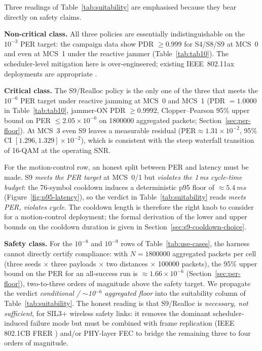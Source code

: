 \documentclass[journal,onecolumn,11pt,a4paper]{IEEEtran}
\begin{document}
Three readings of Table~\ref{tab:suitability} are emphasised because
they bear directly on safety claims.

\textbf{Non-critical class.} All three policies are essentially
indistinguishable on the $10^{-3}$ PER target: the campaign data
show PDR $\geq 0.999$ for S4/S8/S9 at MCS~0 and even at MCS~1 under
the reactive jammer (Table~\ref{tab:tab10}). The scheduler-level
mitigation here is over-engineered; existing IEEE~802.11ax
deployments are appropriate \cite{Aij20,Bel19,Tut21}.

\textbf{Critical class.} The S9/Realloc policy is the only one of the
three that meets the $10^{-6}$ PER target under reactive jamming at
MCS~0 and MCS~1 (PDR $=1.0000$ in Table~\ref{tab:tab10}, jammer-ON
PDR $\geq 0.9992$, Clopper--Pearson 95\% upper bound on PER
$\leq 2.05\times 10^{-6}$ on \num{1800000} aggregated packets;
Section~\ref{sec:per-floor}). At MCS~3 even S9 leaves a measurable
residual ($\mathrm{PER}\approx 1.31\times 10^{-2}$, 95\% CI
$[1.296,1.329]\times 10^{-2}$), which is consistent with the steep
waterfall transition of 16-QAM at the operating SNR.

For the motion-control row, an honest split between PER and latency
must be made. S9 \emph{meets the PER target} at MCS~0/1 but
\emph{violates the 1\,ms cycle-time budget}: the
\SI{76}{}-symbol cooldown induces a deterministic p95 floor of
$\approx \SI{5.4}{ms}$ (Figure~\ref{fig:p95-latency}), so the
verdict in Table~\ref{tab:suitability} reads
\emph{meets PER, violates cycle}. The cooldown length is therefore
the right knob to consider for a motion-control deployment; the
formal derivation of the lower and upper bounds on the cooldown
duration is given in Section~\ref{sec:s9-cooldown-choice}.

\textbf{Safety class.} For the $10^{-8}$ and $10^{-9}$ rows of
Table~\ref{tab:use-cases}, the harness cannot directly certify
compliance: with $N = \num{1800000}$ aggregated packets per cell
(three seeds $\times$ three payloads $\times$ two distances
$\times$ \num{100000} packets), the 95\% upper bound on the PER
for an all-success run is
$\approx 1.66\times 10^{-6}$ (Section~\ref{sec:per-floor}),
two-to-three orders of magnitude above the safety target. We
propagate the verdict \emph{conditional / $\sim$10$^{-6}$
aggregated floor} into the suitability column of
Table~\ref{tab:suitability}. The honest reading is that S9/Realloc
is \emph{necessary, not sufficient}, for SIL3+ wireless safety
links: it removes the dominant scheduler-induced failure mode but
must be combined with frame replication (IEEE 802.1CB FRER
\cite{IEEE802CB}) and/or PHY-layer FEC \cite{Fan22} to bridge the
remaining three to four orders of magnitude.
\end{document}
